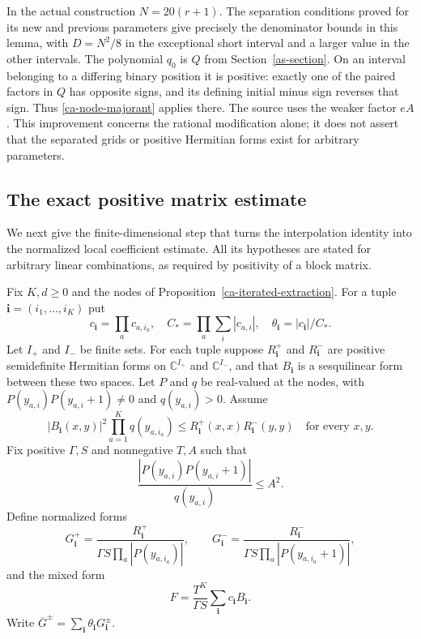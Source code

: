 In the actual construction $N=20(r+1)$.
The separation conditions proved for its new and previous
parameters give precisely the denominator bounds in this
lemma, with $D=N^2/8$ in the exceptional short interval
and a larger value in the other intervals.
The polynomial $q_0$ is $Q$ from Section~\ref{as-section}.
On an interval belonging to a differing binary position it
is positive: exactly one of the paired factors in $Q$ has
opposite signs, and its defining initial minus sign reverses
that sign.  Thus \eqref{ca-node-majorant} applies there.
The source uses the weaker factor $eA$.
This improvement concerns the rational modification alone;
it does not assert that the separated grids or positive
Hermitian forms exist for arbitrary parameters.

\subsection{The exact positive matrix estimate}

We next give the finite-dimensional step that turns the
interpolation identity into the normalized local coefficient
estimate.  All its hypotheses are stated for arbitrary
linear combinations, as required by positivity of a block
matrix.

Fix $K,d\geq0$ and the nodes of
Proposition~\ref{ca-iterated-extraction}.
For a tuple $\boldsymbol i=(i_1,\ldots,i_K)$ put
\[
 c_{\boldsymbol i}=\prod_a c_{a,i_a},\quad
 C_*=\prod_a\sum_i|c_{a,i}|,\quad
 \theta_{\boldsymbol i}=|c_{\boldsymbol i}|/C_*.
\]
Let $I_+$ and $I_-$ be finite sets.  For each tuple suppose
$R^+_{\boldsymbol i}$ and $R^-_{\boldsymbol i}$ are
positive semidefinite Hermitian forms on
$\mathbb C^{I_+}$ and $\mathbb C^{I_-}$, and that
$B_{\boldsymbol i}$ is a sesquilinear form between these
two spaces.  Let $P$ and $q$ be real-valued at the nodes,
with $P(y_{a,i})P(y_{a,i}+1)\ne0$ and $q(y_{a,i})>0$.
Assume
\begin{equation}\label{ca-pairing-assumption}
 |B_{\boldsymbol i}(x,y)|^2
       \prod_{a=1}^Kq(y_{a,i_a})
       \leq R^+_{\boldsymbol i}(x,x)
                 R^-_{\boldsymbol i}(y,y)
 \quad\text{for every }x,y.
\end{equation}
Fix positive $\Gamma,S$ and nonnegative $T,A$ such that
\[
 \frac{|P(y_{a,i})P(y_{a,i}+1)|}{q(y_{a,i})}
                                                  \leq A^2.
\]
Define normalized forms
\[
 G^+_{\boldsymbol i}
       =\frac{R^+_{\boldsymbol i}}
                 {\Gamma S\prod_a|P(y_{a,i_a})|},\qquad
 G^-_{\boldsymbol i}
       =\frac{R^-_{\boldsymbol i}}
                 {\Gamma S\prod_a|P(y_{a,i_a}+1)|},
\]
and the mixed form
\[
 F=\frac{T^K}{\Gamma S}
            \sum_{\boldsymbol i}c_{\boldsymbol i}B_{\boldsymbol i}.
\]
Write $\overline G^\pm=\sum_{\boldsymbol i}
\theta_{\boldsymbol i}G^\pm_{\boldsymbol i}$.

